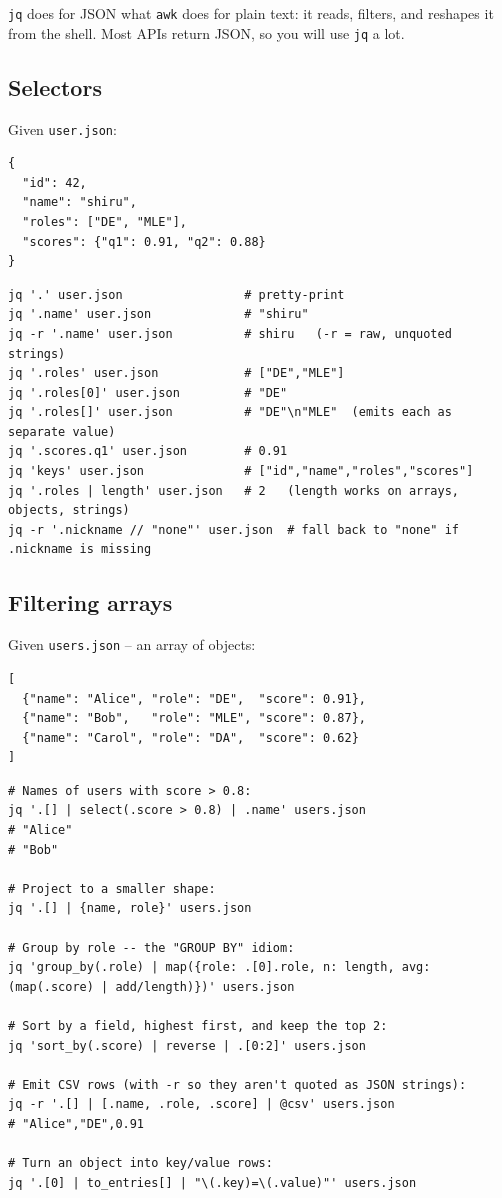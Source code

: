 \documentclass[11pt,a4paper]{article}
\begin{document}
\texttt{jq} does for JSON what \texttt{awk} does for plain text: it
reads, filters, and reshapes it from the shell. Most APIs return
JSON, so you will use \texttt{jq} a lot.

\subsection*{Selectors}

Given \texttt{user.json}:

\begin{lstlisting}[style=bashstyle]
{
  "id": 42,
  "name": "shiru",
  "roles": ["DE", "MLE"],
  "scores": {"q1": 0.91, "q2": 0.88}
}
\end{lstlisting}

\begin{lstlisting}[style=bashstyle]
jq '.' user.json                 # pretty-print
jq '.name' user.json             # "shiru"
jq -r '.name' user.json          # shiru   (-r = raw, unquoted strings)
jq '.roles' user.json            # ["DE","MLE"]
jq '.roles[0]' user.json         # "DE"
jq '.roles[]' user.json          # "DE"\n"MLE"  (emits each as separate value)
jq '.scores.q1' user.json        # 0.91
jq 'keys' user.json              # ["id","name","roles","scores"]
jq '.roles | length' user.json   # 2   (length works on arrays, objects, strings)
jq -r '.nickname // "none"' user.json  # fall back to "none" if .nickname is missing
\end{lstlisting}

\subsection*{Filtering arrays}

Given \texttt{users.json} -- an array of objects:

\begin{lstlisting}[style=bashstyle]
[
  {"name": "Alice", "role": "DE",  "score": 0.91},
  {"name": "Bob",   "role": "MLE", "score": 0.87},
  {"name": "Carol", "role": "DA",  "score": 0.62}
]
\end{lstlisting}

\begin{lstlisting}[style=bashstyle]
# Names of users with score > 0.8:
jq '.[] | select(.score > 0.8) | .name' users.json
# "Alice"
# "Bob"

# Project to a smaller shape:
jq '.[] | {name, role}' users.json

# Group by role -- the "GROUP BY" idiom:
jq 'group_by(.role) | map({role: .[0].role, n: length, avg: (map(.score) | add/length)})' users.json

# Sort by a field, highest first, and keep the top 2:
jq 'sort_by(.score) | reverse | .[0:2]' users.json

# Emit CSV rows (with -r so they aren't quoted as JSON strings):
jq -r '.[] | [.name, .role, .score] | @csv' users.json
# "Alice","DE",0.91

# Turn an object into key/value rows:
jq '.[0] | to_entries[] | "\(.key)=\(.value)"' users.json
\end{lstlisting}
\end{document}
